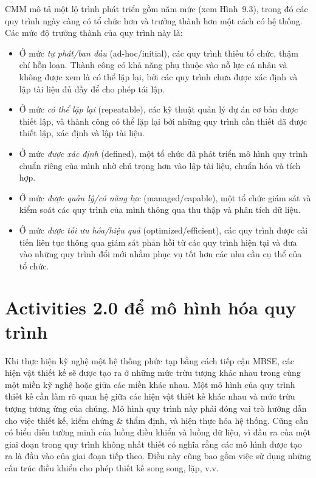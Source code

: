 CMM mô tả một lộ trình phát triển gồm năm mức (xem Hình~9.3), trong đó các quy trình ngày càng có tổ chức hơn và trưởng thành hơn một cách có hệ thống. Các mức độ trưởng thành của quy trình này là:
\begin{itemize}
\item Ở mức \emph{tự phát/ban đầu} (ad-hoc/initial), các quy trình thiếu tổ chức, thậm chí hỗn loạn. Thành công có khả năng phụ thuộc vào nỗ lực cá nhân và không được xem là có thể lặp lại, bởi các quy trình chưa được xác định và lập tài liệu đủ đầy để cho phép tái lập.
\item Ở mức \emph{có thể lặp lại} (repeatable), các kỹ thuật quản lý dự án cơ bản được thiết lập, và thành công có thể lặp lại bởi những quy trình cần thiết đã được thiết lập, xác định và lập tài liệu.
\item Ở mức \emph{được xác định} (defined), một tổ chức đã phát triển mô hình quy trình chuẩn riêng của mình nhờ chú trọng hơn vào lập tài liệu, chuẩn hóa và tích hợp.
\item Ở mức \emph{được quản lý/có năng lực} (managed/capable), một tổ chức giám sát và kiểm soát các quy trình của mình thông qua thu thập và phân tích dữ liệu.
\item Ở mức \emph{được tối ưu hóa/hiệu quả} (optimized/efficient), các quy trình được cải tiến liên tục thông qua giám sát phản hồi từ các quy trình hiện tại và đưa vào những quy trình đổi mới nhằm phục vụ tốt hơn các nhu cầu cụ thể của tổ chức.
\end{itemize}


\section{Activities 2.0 để mô hình hóa quy trình}
Khi thực hiện kỹ nghệ một hệ thống phức tạp bằng cách tiếp cận MBSE, các hiện vật thiết kế sẽ được tạo ra ở những mức trừu tượng khác nhau trong cùng một miền kỹ nghệ hoặc giữa các miền khác nhau. Một mô hình của quy trình thiết kế cần làm rõ quan hệ giữa các hiện vật thiết kế khác nhau và mức trừu tượng tương ứng của chúng. Mô hình quy trình này
phải đóng vai trò hướng dẫn cho việc thiết kế, kiểm chứng \& thẩm định, và hiện thực hóa hệ thống. Cũng cần có biểu diễn tường minh của luồng điều khiển và luồng dữ liệu, vì đầu ra của một giai đoạn trong quy trình không nhất thiết có nghĩa rằng các mô hình được tạo ra là đầu vào của giai đoạn tiếp theo. Điều này cũng bao gồm việc sử dụng những cấu trúc điều khiển cho phép thiết kế song song, lặp, v.v.

